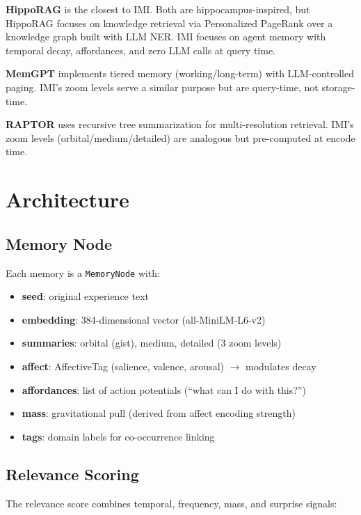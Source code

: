 \documentclass[11pt]{article}
\begin{document}
\textbf{HippoRAG} \citep{gutierrez2024} is the closest to IMI. Both are
hippocampus-inspired, but HippoRAG focuses on knowledge retrieval via
Personalized PageRank over a knowledge graph built with LLM NER. IMI focuses
on agent memory with temporal decay, affordances, and zero LLM calls at
query time.

\textbf{MemGPT} \citep{packer2023} implements tiered memory (working/long-term)
with LLM-controlled paging. IMI's zoom levels serve a similar purpose but
are query-time, not storage-time.

\textbf{RAPTOR} \citep{sarthi2024} uses recursive tree summarization for
multi-resolution retrieval. IMI's zoom levels (orbital/medium/detailed) are
analogous but pre-computed at encode time.

\section{Architecture}

\subsection{Memory Node}

Each memory is a \texttt{MemoryNode} with:
\begin{itemize}
  \item \textbf{seed}: original experience text
  \item \textbf{embedding}: 384-dimensional vector (all-MiniLM-L6-v2)
  \item \textbf{summaries}: orbital (gist), medium, detailed (3 zoom levels)
  \item \textbf{affect}: AffectiveTag (salience, valence, arousal) $\rightarrow$ modulates decay
  \item \textbf{affordances}: list of action potentials (``what can I do with this?'')
  \item \textbf{mass}: gravitational pull (derived from affect encoding strength)
  \item \textbf{tags}: domain labels for co-occurrence linking
\end{itemize}

\subsection{Relevance Scoring}

The relevance score combines temporal, frequency, mass, and surprise signals:
\end{document}
